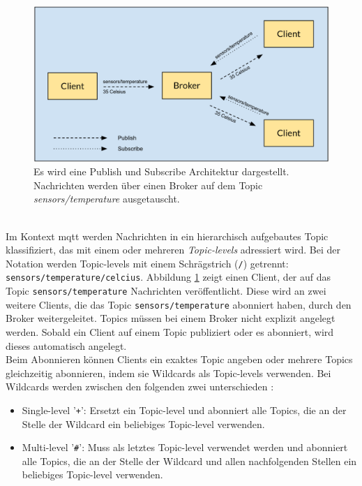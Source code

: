 \begin{figure}[h]
    \centering
    \includegraphics[scale=0.33]{images/publish_subscribe.png}
    \caption{Es wird eine Publish und Subscribe Architektur dargestellt. Nachrichten werden über einen Broker auf dem Topic \textit{sensors/temperature} ausgetauscht.}
    \label{fig:publish-subscribe}
\end{figure}
\\
Im Kontext \ac{mqtt} werden Nachrichten in ein hierarchisch aufgebautes Topic klassifiziert, das mit einem oder mehreren \textit{Topic-levels} adressiert wird.
Bei der Notation werden Topic-levels mit einem Schrägstrich (\verb|/|) getrennt: \verb|sensors/temperature/celcius|.
Abbildung \ref{fig:publish-subscribe} zeigt einen Client, der auf das Topic \verb|sensors/temperature| Nachrichten veröffentlicht. Diese wird an zwei weitere Clients, die das Topic \verb|sensors/temperature| abonniert haben, durch den Broker weitergeleitet.
Topics müssen bei einem Broker nicht explizit angelegt werden. Sobald ein Client auf einem Topic publiziert oder es abonniert, wird dieses automatisch angelegt.\cite{WhatMQTTDefinition}\\
Beim Abonnieren können Clients ein exaktes Topic angeben oder mehrere Topics gleichzeitig abonnieren, indem sie Wildcards als Topic-levels verwenden.
Bei Wildcards werden zwischen den folgenden zwei unterschieden \cite{teamMQTTTopicsBest}:
\begin{itemize}
    \item Single-level '\verb|+|': Ersetzt ein Topic-level und abonniert alle Topics, die an der Stelle der Wildcard ein beliebiges Topic-level verwenden.
    \item Multi-level '\verb|#|': Muss als letztes Topic-level verwendet werden und abonniert alle Topics, die an der Stelle der Wildcard und allen nachfolgenden Stellen ein beliebiges Topic-level verwenden.
\end{itemize}
